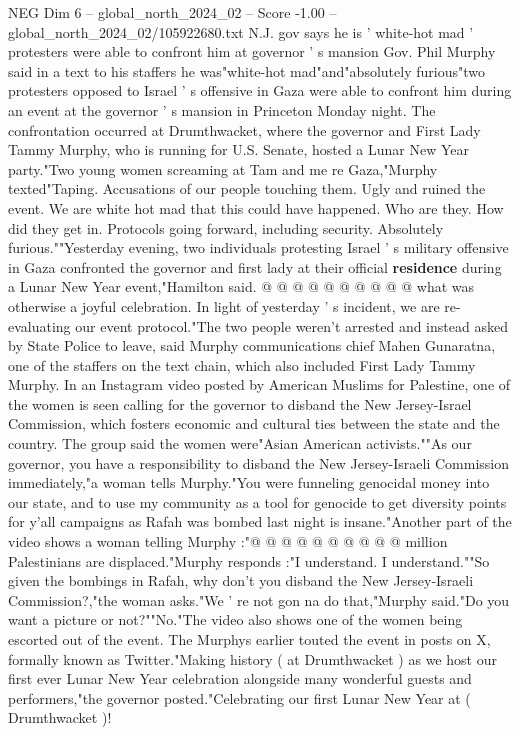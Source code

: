 \begin{textsample}{NEG Dim 6 – global\_north\_2024\_02 – Score -1.00 – global\_north\_2024\_02/105922680.txt}  \label{ex:f6_neg_282}
N.J. gov says he is ' white-hot mad ' protesters were able to confront him at governor ' s mansion Gov.
Phil Murphy said in a text to his staffers he was"white-hot mad"and"absolutely furious"two protesters opposed to Israel ' s offensive in Gaza were able to confront him during an event at the governor ' s mansion in Princeton Monday night.
The confrontation occurred at Drumthwacket, where the governor and First Lady Tammy Murphy, who is running for U.S.
Senate, hosted a Lunar New Year party."Two young women screaming at Tam and me re Gaza,"Murphy texted"Taping.
Accusations of our people touching them.
Ugly and ruined the event.
We are white hot mad that this could have happened.
Who are they.
How did they get in.
Protocols going forward, including security.
Absolutely furious.""Yesterday evening, two individuals protesting Israel ' s military offensive in Gaza confronted the governor and first lady at their official \textbf{residence} during a Lunar New Year event,"Hamilton said. @ @ @ @ @ @ @ @ @ @ what was otherwise a joyful celebration.
In light of yesterday ' s incident, we are re-evaluating our event protocol."The two people weren't arrested and instead asked by State Police to leave, said Murphy communications chief Mahen Gunaratna, one of the staffers on the text chain, which also included First Lady Tammy Murphy.
In an Instagram video posted by American Muslims for Palestine, one of the women is seen calling for the governor to disband the New Jersey-Israel Commission, which fosters economic and cultural ties between the state and the country.
The group said the women were"Asian American activists.""As our governor, you have a responsibility to disband the New Jersey-Israeli Commission immediately,"a woman tells Murphy."You were funneling genocidal money into our state, and to use my community as a tool for genocide to get diversity points for y'all campaigns as Rafah was bombed last night is insane."Another part of the video shows a woman telling Murphy :"@ @ @ @ @ @ @ @ @ @ million Palestinians are displaced."Murphy responds :"I understand.
I understand.""So given the bombings in Rafah, why don't you disband the New Jersey-Israeli Commission?,"the woman asks."We ' re not gon na do that,"Murphy said."Do you want a picture or not?""No."The video also shows one of the women being escorted out of the event.
The Murphys earlier touted the event in posts on X, formally known as Twitter."Making history ( at Drumthwacket ) as we host our first ever Lunar New Year celebration alongside many wonderful guests and performers,"the governor posted."Celebrating our first Lunar New Year at ( Drumthwacket )!

\end{textsample}
